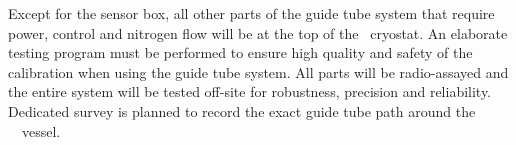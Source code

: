 Except for the sensor box, all other parts of the guide tube system that require power, control and nitrogen flow will be at the top of the \AAr\ cryostat.  An elaborate testing program must be performed to ensure high quality and safety of the calibration when using the guide tube system. All parts will be radio-assayed and the entire system will be tested off-site for robustness, precision and reliability. Dedicated survey is planned to record the exact guide tube path around the \TPC\ \PMMA\ vessel.